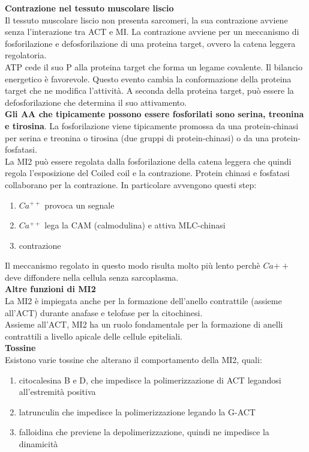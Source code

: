             \textbf{Contrazione nel tessuto muscolare liscio}\\
                Il tessuto muscolare liscio non presenta sarcomeri, la sua contrazione avviene senza l'interazione tra ACT e MI.
                La contrazione avviene per un meccanismo di fosforilazione e defosforilazione di una proteina target, ovvero la catena leggera regolatoria.\\
                ATP cede il suo P alla proteina target che forma un legame covalente. Il bilancio energetico è favorevole. Questo evento cambia la conformazione della proteina target che ne modifica l'attività.
                A seconda della proteina target, può essere la defosforilazione che determina il suo attivamento.\\
                \textbf{Gli AA che tipicamente possono essere fosforilati sono serina, treonina e tirosina}. La fosforilazione viene tipicamente promossa da una protein-chinasi per serina e treonina o tirosina (due gruppi di protein-chinasi) o da una protein-fosfatasi.\\
                La MI2 può essere regolata dalla fosforilazione della catena leggera che quindi regola l'esposizione del Coiled coil e la contrazione. Protein chinasi e fosfatasi collaborano per la contrazione. In particolare avvengono questi step:
                \begin{enumerate}
                    \item $Ca^{++}$ provoca un segnale
                    \item $Ca^{++}$ lega la CAM (calmodulina) e attiva MLC-chinasi
                    \item contrazione
                \end{enumerate}
                Il meccanismo regolato in questo modo risulta molto più lento perchè $Ca{++}$ deve diffondere nella cellula senza sarcoplasma.\\
                
            \textbf{Altre funzioni di MI2}\\
                La MI2 è impiegata anche per la formazione dell'anello contrattile (assieme all'ACT) durante anafase e telofase per la citochinesi. \\
                Assieme all'ACT, MI2 ha un ruolo fondamentale per la formazione di anelli contrattili a livello apicale delle cellule epiteliali.\\
                
            \textbf{Tossine}\\
                Esistono varie tossine che alterano il comportamento della MI2, quali:
                \begin{enumerate}
                    \item citocalesina B e D, che impedisce la polimerizzazione di ACT legandosi all'estremità positiva
                    \item latrunculin che impedisce la polimerizzazione legando la G-ACT
                    \item falloidina che previene la depolimerizzazione, quindi ne impedisce la dinamicità
                \end{enumerate}
            
